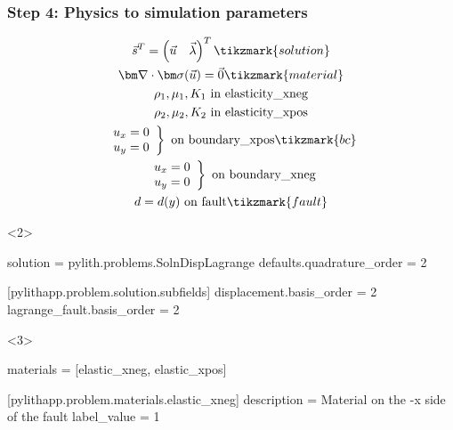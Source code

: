 \documentclass{beamer}
\begin{document}
\begin{frame}[t,fragile]
  \frametitle{Step 4: Physics to simulation parameters}
  \summary{}

  \begin{minipage}[t]{0.35\textwidth}
    {\scriptsize
    \begin{gather*}
    \vec{s}^T = \left( \vec{u} \quad \vec{\lambda} \right)^T \tikzmark{solution}\\
    \tensor{\nabla} \cdot \tensor{\sigma}(\vec{u}) = \vec{0} \tikzmark{material} \\
    \rho_1, \mu_1, K_1 \text{ in elasticity\_xneg} \\ 
    \rho_2, \mu_2, K_2 \text{ in elasticity\_xpos} \\ 
    \left. \begin{array}{c} u_x = 0 \\ u_y = 0 \end{array}\right\} \text{ on boundary\_xpos} \tikzmark{bc}\\
    \left. \begin{array}{c} u_x = 0 \\ u_y = 0 \end{array}\right\} \text{ on boundary\_xneg} \\
    d = d(y) \text{ on fault} \tikzmark{fault}
    \end{gather*}}
  \end{minipage}
  \hfill
  \begin{minipage}[t]{0.60\textwidth}
    \begin{onlyenv}<2>
      \begin{cfgcode}
        solution = pylith.problems.SolnDispLagrange
        defaults.quadrature_order = 2
        
        [pylithapp.problem.solution.subfields]
        displacement.basis_order = 2
        lagrange_fault.basis_order = 2
      \end{cfgcode}
    \end{onlyenv}
    \begin{onlyenv}<3>
      \begin{cfgcode}
        materials = [elastic_xneg, elastic_xpos]

        [pylithapp.problem.materials.elastic_xneg]
        description = Material on the -x side of the fault
        label_value = 1


\end{cfgcode}
\end{onlyenv}
\end{minipage}
\end{frame}
\end{document}
